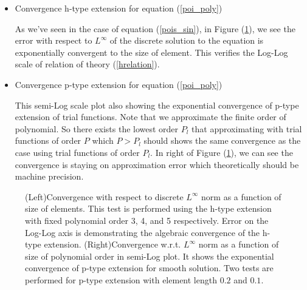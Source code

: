 \begin{itemize}

\item {Convergence h-type extension for equation (\ref{poi_poly})}

As we've seen in the case of equation (\ref{pois_sin}), in Figure (\ref{ScrvconvDN}), we see the error with respect to $L^{\infty}$ of the discrete solution to the equation is exponentially convergent to the size of element. This verifies the Log-Log scale of relation of theory (\ref{hrelation}).

\item {Convergence p-type extension for equation (\ref{poi_poly})}

This semi-Log scale plot also showing the exponential convergence of p-type extension of trial functions. Note that we approximate the finite order of polynomial. So there exists the lowest order $P_l$ that approximating with trial functions of order $P$ which $P > P_l$ should shows the same convergence as the case using trial functions of order $P_l$. In right of Figure (\ref{ScrvconvDN}), we can see the convergence is staying on approximation error which theoretically should be machine precision.

\end{itemize}

\begin{figure}[h]
\begin{center}
\caption{\label{ScrvconvDN}
(Left)Convergence with respect to discrete $L^{\infty}$ norm as a function of size of elements. This test is performed using the h-type extension with fixed polynomial order 3, 4, and 5 respectively. Error on the Log-Log axis is demonstrating the algebraic convergence of the h-type extension.
(Right)Convergence w.r.t. $L^{\infty}$ norm as a function of size of polynomial order in semi-Log plot. It shows the exponential convergence of p-type extension for smooth solution. Two tests are performed for p-type extension with element length $0.2$ and $0.1$.
}
\end{center}
\end{figure}

